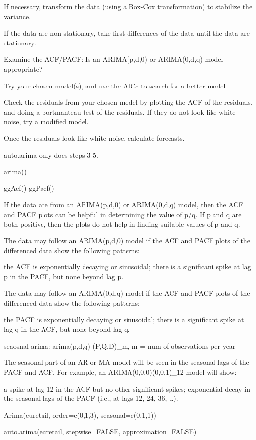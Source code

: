\documentclass[]{book}
\theoremstyle{definition}
\theoremstyle{definition}
\theoremstyle{definition}
\theoremstyle{remark}
\begin{document}
If necessary, transform the data (using a Box-Cox transformation) to
stabilize the variance.

If the data are non-stationary, take first differences of the data until
the data are stationary.

Examine the ACF/PACF: Is an ARIMA(p,d,0) or ARIMA(0,d,q) model
appropriate?

Try your chosen model(s), and use the AICc to search for a better model.

Check the residuals from your chosen model by plotting the ACF of the
residuals, and doing a portmanteau test of the residuals. If they do not
look like white noise, try a modified model.

Once the residuals look like white noise, calculate forecasts.

auto.arima only does steps 3-5.

arima()

ggAcf() \textbar{} ggPacf()

If the data are from an ARIMA(p,d,0) or ARIMA(0,d,q) model, then the ACF
and PACF plots can be helpful in determining the value of p/q. If p and
q are both positive, then the plots do not help in finding suitable
values of p and q.

The data may follow an ARIMA(p,d,0) model if the ACF and PACF plots of
the differenced data show the following patterns:

the ACF is exponentially decaying or sinusoidal; there is a significant
spike at lag p in the PACF, but none beyond lag p.

The data may follow an ARIMA(0,d,q) model if the ACF and PACF plots of
the differenced data show the following patterns:

the PACF is exponentially decaying or sinusoidal; there is a significant
spike at lag q in the ACF, but none beyond lag q.

seaosnal arima: arima(p,d,q) (P,Q,D)\_m, m = num of observations per
year

The seasonal part of an AR or MA model will be seen in the seasonal lags
of the PACF and ACF. For example, an ARIMA(0,0,0)(0,0,1)\_12 model will
show:

a spike at lag 12 in the ACF but no other significant spikes;
exponential decay in the seasonal lags of the PACF (i.e., at lags 12,
24, 36, \ldots{}).

Arima(euretail, order=c(0,1,3), seasonal=c(0,1,1))

auto.arima(euretail, stepwise=FALSE, approximation=FALSE)
\end{document}
